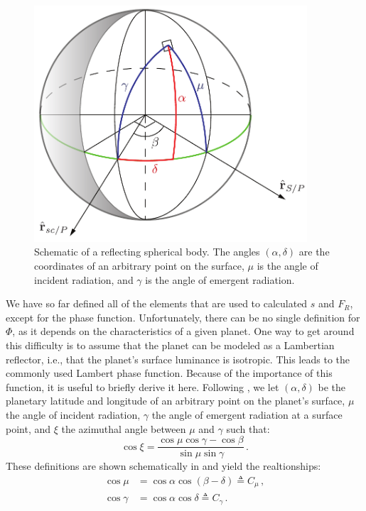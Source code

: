 \begin{figure}[ht]
 \center
 \includegraphics[width=4in]{./figures/reflection_diagram}
  \caption[Reflection Diagram]{ \label{fig:reflection_diagram} Schematic of a reflecting spherical body.  The angles $(\alpha, \delta)$ are the coordinates of an arbitrary point on the surface, $\mu$ is the angle of incident radiation, and $\gamma$ is the angle of emergent radiation.}
 \end{figure}
 We have so far defined all of the elements that are used to calculated $s$ and $F_R$, except for the phase function.  Unfortunately, there can be no single definition for $\Phi$, as it depends on the characteristics of a given planet.  One way to get around this difficulty is to assume that the planet can be modeled as a Lambertian reflector, i.e., that the planet's surface luminance is isotropic.  This leads to the commonly used Lambert phase function.  Because of the importance of this function, it is useful to briefly derive it here.  Following \citet{sobolev}, we let $(\alpha, \delta)$ be the planetary latitude and longitude of an arbitrary point on the planet's surface, $\mu$ the angle of incident radiation, $\gamma$ the angle of emergent radiation at a surface point, and $\xi$ the azimuthal angle between $\mu$ and $\gamma$ such that:
\begin{equation}
\cos \xi = \frac{\cos\mu\cos\gamma - \cos\beta}{\sin\mu\sin\gamma} \,.
\end{equation}
These definitions are shown schematically in  and yield the realtionships:
\begin{align}
	\cos\mu &= \cos\alpha \cos(\beta - \delta) \triangleq C_\mu \,,\\
	\cos\gamma &= \cos\alpha \cos\delta \triangleq C_\gamma \,.
\end{align}
	
